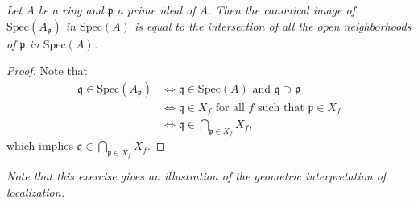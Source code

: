 \begin{problem}\em
Let $A$ be a ring and $\mathfrak{p}$ a prime ideal of $A$. Then the canonical image of $\mathrm{Spec}(A_\mathfrak{p})$ in $\mathrm{Spec}(A)$ is equal to the intersection of all the open neighborhoods of $\mathfrak{p}$ in $\mathrm{Spec}(A)$.
\end{problem}
\begin{proof}
Note that 
$$
\begin{aligned}
\mathfrak{q}\in\mathrm{Spec}(A_\mathfrak{p}) & \iff \mathfrak{q}\in\mathrm{Spec}(A)\text{ and }\mathfrak{q}\supset\mathfrak{p} \\
& \iff \mathfrak{q}\in X_f\text{ for all }f\text{ such that }\mathfrak{p}\in X_f \\
& \iff \mathfrak{q}\in\bigcap_{\mathfrak{p}\in X_f}X_f,
\end{aligned}
$$
which implies $\mathfrak{q}\in\bigcap_{\mathfrak{p}\in X_f}X_f$.
\end{proof}
\begin{note}\em
Note that this exercise gives an illustration of the geometric interpretation of localization.
\end{note}

